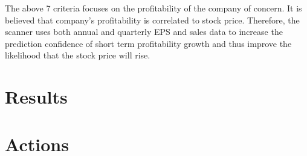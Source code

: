 \documentclass{article}
\begin{document}
The above 7 criteria focuses on the profitability of the company of concern. It is believed that company's profitability is correlated to stock price. Therefore, the scanner uses both annual and quarterly EPS and sales data to increase the prediction confidence of short term profitability growth and thus improve the likelihood that the stock price will rise.





\section{Results}

\section{Actions}
\end{document}
